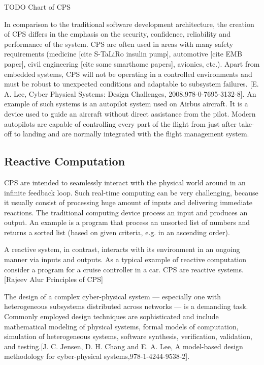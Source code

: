 TODO Chart of CPS

In comparison to the traditional software development architecture, the creation of CPS differs in the emphasis on the security, confidence, reliability and performance of the system. CPS are often used in areas with many safety requirements (medicine [cite S-TaLiRo insulin pump], automotive [cite EMB paper], civil engineering [cite some smarthome papers], avionics, etc.). Apart from embedded systems, CPS will not be operating in a controlled environments and must be robust to unexpected conditions and adaptable to subsystem failures. [E. A. Lee, Cyber Physical Systems: Design Challenges, 2008,978-0-7695-3132-8]. An example of such systems is an autopilot system used on Airbus aircraft. It is a device used to guide an aircraft without direct assistance from the pilot. Modern autopilots are capable of controlling every part of the flight from just after take-off to landing and are normally integrated with the flight management system.

\subsection{Reactive Computation}

CPS are intended to seamlessly interact with the physical world around in an infinite feedback loop. Such real-time computing can be very challenging, because it usually consist of processing huge amount of inputs and delivering immediate reactions. The traditional computing device process an input and produces an output. An example is a program that process an unsorted list of numbers and returns a sorted list (based on given criteria, e.g. in an ascending order).

A reactive system, in contrast, interacts with its environment in an ongoing manner via inputs and outputs. As a typical example of reactive computation consider a program for a cruise controller in a car. CPS are reactive systems.[Rajeev Alur Principles of CPS]

The design of a complex cyber-physical system — especially one with heterogeneous subsystems distributed across networks — is a demanding task. Commonly employed design techniques are sophisticated and include mathematical modeling of physical systems, formal models of computation, simulation of heterogeneous systems, software synthesis, verification, validation, and testing.[J. C. Jensen, D. H. Chang and E. A. Lee, A model-based design methodology for cyber-physical systems,978-1-4244-9538-2].

